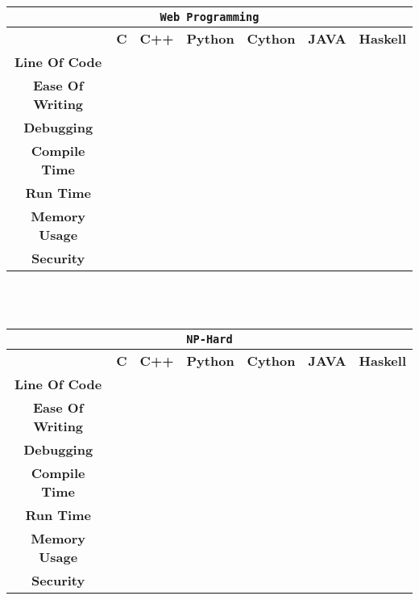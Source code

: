 \\
\linebreak
\\
\begin{tabular}{|c|c|c|c|c|c|c|}
\hline
\multicolumn{7}{|c|}{\texttt{Web Programming}}\\\hline
\textbf{} & \textbf{C} & \textbf{C++} & \textbf{Python} & \textbf{Cython} & \textbf{JAVA} & \textbf{Haskell}\\\hline
\textbf{Line Of Code} & & & & & &  \\
\hline
\textbf{Ease Of Writing} & & & & & & \\
\hline
\textbf{Debugging} & & & & & & \\
\hline
\textbf{Compile Time} & & & & & & \\
\hline
\textbf{Run Time} & & & & & & \\
\hline
\textbf{Memory Usage} & & & & & & \\
\hline
\textbf{Security} & & & & & & \\
\hline
\end{tabular}
\\
\linebreak
\\
\begin{tabular}{|c|c|c|c|c|c|c|}
\hline
\multicolumn{7}{|c|}{\texttt{NP-Hard}}\\\hline
\textbf{} & \textbf{C} & \textbf{C++} & \textbf{Python} & \textbf{Cython} & \textbf{JAVA} & \textbf{Haskell}\\\hline
\textbf{Line Of Code} & & & & & &  \\
\hline
\textbf{Ease Of Writing} & & & & & & \\
\hline
\textbf{Debugging} & & & & & & \\
\hline
\textbf{Compile Time} & & & & & & \\
\hline
\textbf{Run Time} & & & & & & \\
\hline
\textbf{Memory Usage} & & & & & & \\
\hline
\textbf{Security} & & & & & & \\
\hline
\end{tabular}
\\